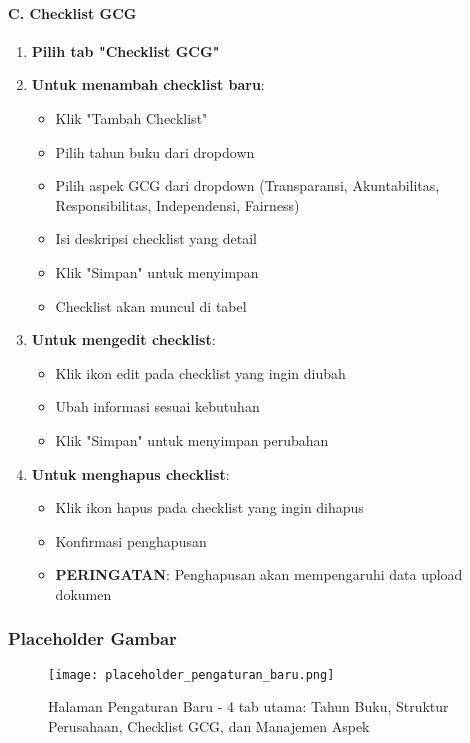\documentclass[12pt,a4paper]{article}
\begin{document}
\paragraph{C. Checklist GCG}
\begin{enumerate}
\item \textbf{Pilih tab "Checklist GCG"}
\item \textbf{Untuk menambah checklist baru}:
\begin{itemize}
\item Klik "Tambah Checklist"
\item Pilih tahun buku dari dropdown
\item Pilih aspek GCG dari dropdown (Transparansi, Akuntabilitas, Responsibilitas, Independensi, Fairness)
\item Isi deskripsi checklist yang detail
\item Klik "Simpan" untuk menyimpan
\item Checklist akan muncul di tabel
\end{itemize}
\item \textbf{Untuk mengedit checklist}:
\begin{itemize}
\item Klik ikon edit pada checklist yang ingin diubah
\item Ubah informasi sesuai kebutuhan
\item Klik "Simpan" untuk menyimpan perubahan
\end{itemize}
\item \textbf{Untuk menghapus checklist}:
\begin{itemize}
\item Klik ikon hapus pada checklist yang ingin dihapus
\item Konfirmasi penghapusan
\item \textbf{PERINGATAN}: Penghapusan akan mempengaruhi data upload dokumen
\end{itemize}
\end{enumerate}

\subsubsection{Placeholder Gambar}
\begin{figure}[H]
\centering
\texttt{[image: placeholder\_pengaturan\_baru.png]}
\caption{Halaman Pengaturan Baru - 4 tab utama: Tahun Buku, Struktur Perusahaan, Checklist GCG, dan Manajemen Aspek}
\label{fig:pengaturan_baru}
\end{figure}
\end{document}
